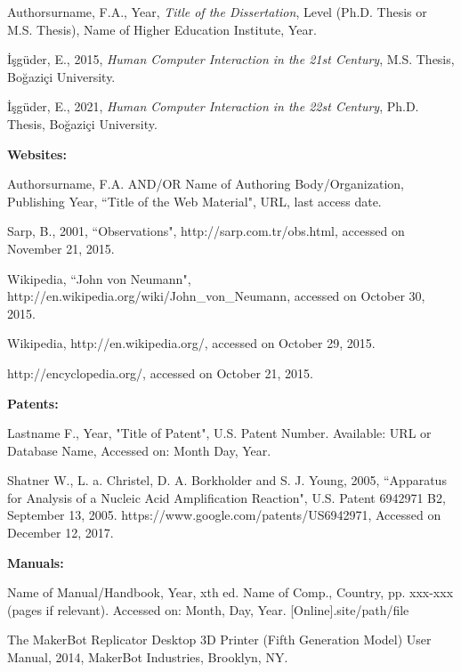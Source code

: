 \documentclass[a4paper,oneside,12pt]{report}
\numberwithin{equation}{chapter}
\begin{document}
\leftskip 5mm \parindent -5mm Authorsurname, F.A., Year, \textit{Title of the Dissertation}, Level (Ph.D. Thesis or M.S. Thesis), Name of Higher Education Institute, Year.

\leftskip 5mm \parindent -5mm İşgüder, E., 2015, \textit{Human Computer Interaction in the 21st Century}, M.S. Thesis, Boğaziçi University.

\leftskip 5mm \parindent -5mm İşgüder, E., 2021, \textit{Human Computer Interaction in the 22st Century}, Ph.D. Thesis, Boğaziçi University.\newline


\leftskip 5mm \parindent -5mm \textbf{Websites:}

\leftskip 5mm \parindent -5mm Authorsurname, F.A. AND/OR Name of Authoring Body/Organization, Publishing Year, ``Title of the Web Material", URL, last access date.

\leftskip 5mm \parindent -5mm Sarp, B., 2001, ``Observations", http://sarp.com.tr/obs.html, accessed on November 21, 2015.

\clearpage
\leftskip 5mm \parindent -5mm Wikipedia, ``John von Neumann", http://en.wikipedia.org/wiki/John\_von\_Neumann, accessed on October 30, 2015.

\leftskip 5mm \parindent -5mm Wikipedia, http://en.wikipedia.org/, accessed on October 29, 2015.

\leftskip 5mm \parindent -5mm http://encyclopedia.org/, accessed on October 21, 2015.\newline


\leftskip 5mm \parindent -5mm \textbf{Patents:}

\leftskip 5mm \parindent -5mm Lastname F., Year, "Title of Patent", U.S. Patent Number. Available: URL or Database Name, Accessed on: Month Day, Year.

\leftskip 5mm \parindent -5mm Shatner W., L. a. Christel, D. A. Borkholder and S. J. Young, 2005, ``Apparatus for Analysis of a Nucleic Acid Amplification Reaction", U.S. Patent 6942971 B2, September 13, 2005. https://www.google.com/patents/US6942971, Accessed on December 12, 2017.


\leftskip 5mm \parindent -5mm \textbf{Manuals:}

\leftskip 5mm \parindent -5mm Name of Manual/Handbook, Year, xth ed. Name of Comp.,  Country, pp. xxx-xxx (pages if relevant). Accessed on: Month, Day, Year. [Online].site/path/file 

\leftskip 5mm \parindent -5mm The MakerBot Replicator Desktop 3D Printer (Fifth Generation Model) User Manual, 2014, MakerBot Industries, Brooklyn, NY.\newline
\end{document}

